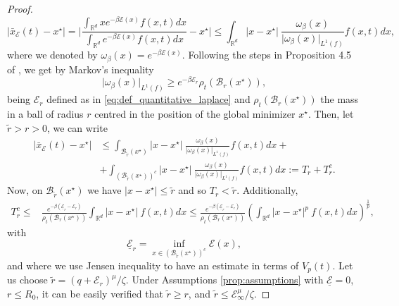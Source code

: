 \documentclass[11pt,handout]{article}%
\numberwithin{equation}{section}
\newcommand{\R}{\mathbb R}
\theoremstyle{definition}
\begin{document}
\begin{proof}
	\begin{equation*}
		\vert \bar{x}_\mathcal{E}(t)-x^\star \vert = \Bigg \vert \frac{\int_{\R^d}x e^{-\beta \mathcal{E}(x)} f(x,t) dx}{\int_{\R^d}  e^{-\beta \mathcal{E}(x)} f(x,t) dx} -x^\star\Bigg \vert \leq   \int_{\R^d} \vert x-x^\star \vert ~ \frac{\omega_\beta(x)}{\vert \omega_\beta(x)\vert_{L^1(f)}}  f(x,t) dx,
	\end{equation*}
	where we denoted by $\omega_\beta(x) = e^{-\beta \mathcal{E}(x)}$.
	Following the steps in Proposition 4.5 of \cite{fornasier2024consensus}, we get by Markov's inequality 
	\begin{equation*}
		\vert \omega_\beta(x)\vert_{L^1(f)}\geq e^{-\beta \mathcal{E}_r} \rho_t(\mathcal{B}_r(x^\star)), 
	\end{equation*}
	being $\mathcal{E}_r$ defined as in \eqref{eq:def_quantitative_laplace} and $\rho_t(\mathcal{B}_r(x^\star))$ the mass in a ball of radius $r$ centred in the position of the global minimizer $x^\star$. Then, let $\tilde{r}>r>0$, we can write 
	\begin{equation*} 
		\begin{split}
			\vert \bar{x}_\mathcal{E}(t)-x^\star \vert & \leq    \int_{\mathcal{B}_{\tilde{r}}(x^\star)} \vert x-x^\star \vert ~  \frac{\omega_\beta(x) }{\vert \omega_\beta(x)\vert_{L^1(f)}}f(x,t) dx  +\\ &+   \int_{\left( \mathcal{B}_{\tilde{r}}(x^\star)\right) ^c} \vert x-x^\star \vert ~  \frac{\omega_\beta(x) }{\vert \omega_\beta(x)\vert_{L^1(f)}}f(x,t) dx:= T_r + T_r^c.
		\end{split}
	\end{equation*} 
	Now, on $\mathcal{B}_{\tilde{r}}(x^\star)$ we have $\vert x-x^\star\vert\leq \tilde{r}$ and so $T_r<\tilde{r}$. Additionally, 
	\begin{equation}
		\begin{split}
			T_r^c \leq &  \frac{e^{-\beta (\underline{\mathcal{E}}_r-\mathcal{E}_r)}}{  \rho_t(\mathcal{B}_r(x^\star))} \int_{\R^d} \vert x-x^\star \vert ~ f(x,t) dx \leq   \frac{e^{-\beta (\underline{\mathcal{E}}_r-\mathcal{E}_r)}}{  \rho_t(\mathcal{B}_r(x^\star))} \left( \int_{\R^d} \vert x-x^\star \vert^p ~ f(x,t) dx\right)^{\frac{1}{p}} ,
		\end{split}
	\end{equation}
	with \[\underline{\mathcal{E}}_r = \inf_{x \in \left( \mathcal{B}_{\tilde{r}}(x^\star)\right) ^c } \mathcal{E}(x),
	\] 
	and where we use Jensen inequality to have an estimate in terms of $V_p(t)$. 
	Let us choose $\tilde{r} = (q+\mathcal{E}_r)^\mu/\zeta$. Under Assumptions \ref{prop:assumptions} with $\underline{\mathcal{E}}=0$, $r\leq R_0$,  it can be easily verified that $\tilde{r}\geq r$, and $\tilde{r}\leq {\mathcal{E}_\infty^\mu}/{\zeta}. $

\end{proof}
\end{document}
